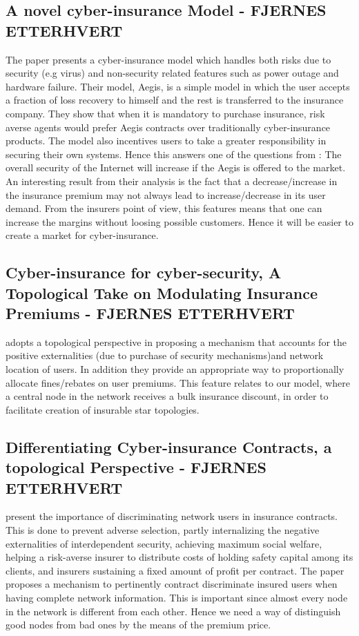\subsection{A novel cyber-insurance Model  - FJERNES ETTERHVERT}
The paper \cite{pal2011aegis} presents a cyber-insurance model which handles both risks due to security (e.g virus) and non-security related features such as power outage and hardware failure. Their model, Aegis, is a simple model in which the user accepts a fraction of loss recovery to himself and the rest is transferred to the insurance company. They show that when it is mandatory to purchase insurance, risk averse agents would prefer Aegis contracts over traditionally cyber-insurance products.
The model also incentives users to take a greater responsibility in securing their own systems. Hence this answers one of the questions from \cite{bohme2010modeling}: The overall security of the Internet will increase if the Aegis is offered to the market. An interesting result from their analysis is the fact that a decrease/increase in the insurance premium may not always lead to increase/decrease in its user demand. From the insurers point of view, this features means that one can increase the margins without loosing possible customers. Hence it will be easier to create a market for cyber-insurance. 


\subsection{Cyber-insurance for cyber-security, A Topological Take on Modulating Insurance Premiums - FJERNES ETTERHVERT}
\cite{pal2012cyberinsurance} adopts a topological perspective in proposing a mechanism that accounts for the positive
 externalities (due to purchase of security mechanisms)and network location of users. In addition they provide an appropriate way to proportionally allocate fines/rebates on user premiums. This feature relates to our model, where a central node in the network receives a bulk insurance discount, in order to facilitate creation of insurable star topologies. 
  
  
 
 
\subsection{Differentiating Cyber-insurance Contracts, a topological Perspective - FJERNES ETTERHVERT}

\cite{paldifferentiating} present the importance of discriminating network users in insurance contracts. This is done to prevent adverse selection, partly internalizing the negative externalities of interdependent security, achieving maximum social welfare, helping a risk-averse insurer to distribute costs of holding safety capital among its clients, and insurers sustaining a fixed amount of profit per contract.
The paper proposes a mechanism to pertinently contract discriminate insured users when having complete network information. This is important since almost every node in the network is different from each other. Hence we need a way of distinguish good nodes from bad ones by the means of the premium price.




  
